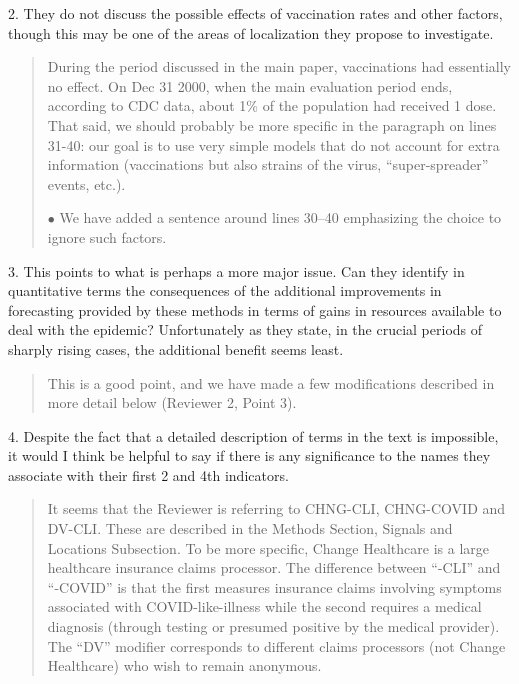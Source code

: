 \documentclass[11pt]{article}
\newenvironment{resp}{\begin{quote}\color{cobalt}}{\end{quote}}
\begin{document}
  2. They do not discuss the possible effects of vaccination rates and other
  factors, though this may be one of the areas of localization they propose to
  investigate.



\begin{resp}
  During the period discussed in the main paper, vaccinations had essentially no
  effect. On Dec 31 2000, when the main evaluation period ends,  according to
  CDC data, about 1\% of the population 
  had received 1 dose. That said, we should probably be more specific in the
  paragraph on lines 31-40: our goal is to use very simple models that do not
  account for extra information (vaccinations but also strains of the virus,
  ``super-spreader'' events, etc.).

  $\bullet$ We have added a sentence around lines 30--40 emphasizing the choice
  to ignore such factors.
\end{resp}


  3. This points to what is perhaps a more major issue. Can they identify in
  quantitative terms the consequences of the additional improvements in
  forecasting provided by these methods in terms of gains in resources available
  to deal with the epidemic? Unfortunately as they state, in the crucial periods
  of sharply rising cases, the additional benefit seems least.


\begin{resp}
  This is a good point, and we have made a few modifications described in more
  detail below (Reviewer 2, Point 3).
\end{resp}



  4. Despite the fact that a detailed description of terms in the text is
  impossible, it would I think be helpful to say if there is any significance to
  the names they associate with their first 2 and 4th indicators.


\begin{resp}
  It seems that the Reviewer is referring to CHNG-CLI, CHNG-COVID and DV-CLI. These are
  described in the Methods Section, Signals and Locations Subsection. To be more
  specific, Change 
  Healthcare is a large healthcare insurance claims processor. The difference
  between ``-CLI'' and ``-COVID'' is that the first measures insurance
  claims involving symptoms
  associated with COVID-like-illness  while the second requires a medical
  diagnosis (through 
  testing or presumed positive by the medical provider). The ``DV'' modifier
  corresponds to different claims processors (not Change Healthcare) who wish to
  remain anonymous.

\end{resp}
\end{document}
